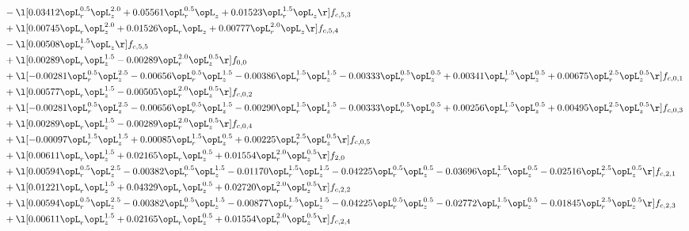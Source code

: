 \begin{alignat}{2}
& - \l[  0.03412 \opL_r^{0.5} \opL_z^{2.0} +  0.05561 \opL_r^{0.5} \opL_z +  0.01523 \opL_r^{1.5} \opL_z  \r] f_{c,5,3} \nonumber \\ 
& + \l[  0.00745 \opL_r \opL_z^{2.0} +  0.01526 \opL_r \opL_z +  0.00777 \opL_r^{2.0} \opL_z  \r] f_{c,5,4} \nonumber \\ 
& - \l[  0.00508 \opL_r^{1.5} \opL_z  \r] f_{c,5,5} \nonumber \\ 
& + \l[  0.00289 \opL_r \opL_z^{1.5}   -0.00289 \opL_r^{2.0} \opL_z^{0.5}  \r] f_{0,0} \nonumber \\ 
& + \l[  -0.00281 \opL_r^{0.5} \opL_z^{2.5}   -0.00656 \opL_r^{0.5} \opL_z^{1.5}   -0.00386 \opL_r^{1.5} \opL_z^{1.5}   -0.00333 \opL_r^{0.5} \opL_z^{0.5} +  0.00341 \opL_r^{1.5} \opL_z^{0.5} +  0.00675 \opL_r^{2.5} \opL_z^{0.5}  \r] f_{c,0,1} \nonumber \\ 
& + \l[  0.00577 \opL_r \opL_z^{1.5}   -0.00505 \opL_r^{2.0} \opL_z^{0.5}  \r] f_{c,0,2} \nonumber \\ 
& + \l[  -0.00281 \opL_r^{0.5} \opL_z^{2.5}   -0.00656 \opL_r^{0.5} \opL_z^{1.5}   -0.00290 \opL_r^{1.5} \opL_z^{1.5}   -0.00333 \opL_r^{0.5} \opL_z^{0.5} +  0.00256 \opL_r^{1.5} \opL_z^{0.5} +  0.00495 \opL_r^{2.5} \opL_z^{0.5}  \r] f_{c,0,3} \nonumber \\ 
& + \l[  0.00289 \opL_r \opL_z^{1.5}   -0.00289 \opL_r^{2.0} \opL_z^{0.5}  \r] f_{c,0,4} \nonumber \\ 
& + \l[  -0.00097 \opL_r^{1.5} \opL_z^{1.5} +  0.00085 \opL_r^{1.5} \opL_z^{0.5} +  0.00225 \opL_r^{2.5} \opL_z^{0.5}  \r] f_{c,0,5} \nonumber \\ 
& + \l[  0.00611 \opL_r \opL_z^{1.5} +  0.02165 \opL_r \opL_z^{0.5} +  0.01554 \opL_r^{2.0} \opL_z^{0.5}  \r] f_{2,0} \nonumber \\ 
& + \l[  0.00594 \opL_r^{0.5} \opL_z^{2.5}   -0.00382 \opL_r^{0.5} \opL_z^{1.5}   -0.01170 \opL_r^{1.5} \opL_z^{1.5}   -0.04225 \opL_r^{0.5} \opL_z^{0.5}   -0.03696 \opL_r^{1.5} \opL_z^{0.5}   -0.02516 \opL_r^{2.5} \opL_z^{0.5}  \r] f_{c,2,1} \nonumber \\ 
& + \l[  0.01221 \opL_r \opL_z^{1.5} +  0.04329 \opL_r \opL_z^{0.5} +  0.02720 \opL_r^{2.0} \opL_z^{0.5}  \r] f_{c,2,2} \nonumber \\ 
& + \l[  0.00594 \opL_r^{0.5} \opL_z^{2.5}   -0.00382 \opL_r^{0.5} \opL_z^{1.5}   -0.00877 \opL_r^{1.5} \opL_z^{1.5}   -0.04225 \opL_r^{0.5} \opL_z^{0.5}   -0.02772 \opL_r^{1.5} \opL_z^{0.5}   -0.01845 \opL_r^{2.5} \opL_z^{0.5}  \r] f_{c,2,3} \nonumber \\ 
& + \l[  0.00611 \opL_r \opL_z^{1.5} +  0.02165 \opL_r \opL_z^{0.5} +  0.01554 \opL_r^{2.0} \opL_z^{0.5}  \r] f_{c,2,4} \nonumber \\ 

\end{alignat}
